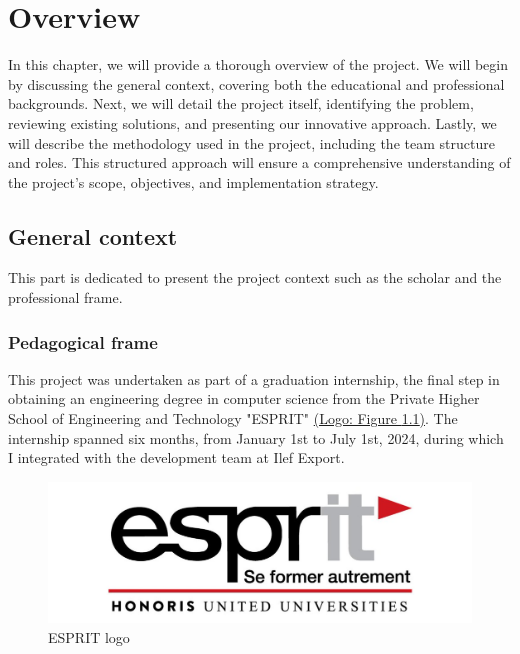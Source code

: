 \chapter{Overview}

In this chapter, we will provide a thorough overview of the project. We will begin by discussing the general context, covering both the educational and professional backgrounds. Next, we will detail the project itself, identifying the problem, reviewing existing solutions, and presenting our innovative approach. Lastly, we will describe the methodology used in the project, including the team structure and roles. This structured approach will ensure a comprehensive understanding of the project's scope, objectives, and implementation strategy.

\pagebreak

\section{General context}
This part is dedicated to present the project context such as the scholar and the professional frame.

\subsection{Pedagogical frame}

This project was undertaken as part of a graduation internship, the final step in obtaining an engineering degree in computer science from the Private Higher School of Engineering and Technology "ESPRIT" \hyperref[fig:ilef_logo]{(Logo: Figure \ref{fig:esprit_logo})}.
 The internship spanned six months, from January 1st to July 1st, 2024, during which I integrated with the development team at Ilef Export.
 

\begin{figure}[htbp]
  \centering  %
  \includegraphics[width=12cm]{./chapters/overview/esprit.jpeg}
  \caption{ESPRIT logo}
  \label{fig:esprit_logo}
\end{figure}

